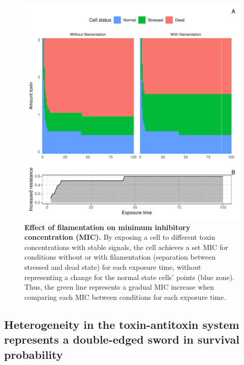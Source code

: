 \documentclass[a4paper, nobind]{templates/ociamthesis}
\begin{document}
\begin{figure}[H]
\includegraphics[width=1\linewidth]{downloadFigs4latex__main/increased-time-resistance} \caption[Effect of filamentation on minimum inhibitory concentration (MIC).]{\textbf{Effect of filamentation on minimum inhibitory concentration (MIC).} By exposing a cell to different toxin concentrations with stable signals, the cell achieves a set MIC for conditions without or with filamentation (separation between stressed and dead state) for each exposure time, without representing a change for the normal state cells' points (blue zone). Thus, the green line represents a gradual MIC increase when comparing each MIC between conditions for each exposure time.}\label{fig:increased-time-resistance}
\end{figure}

\hypertarget{heterogeneity-in-the-toxin-antitoxin-system-represents-a-double-edged-sword-in-survival-probability}{%
\subsection{Heterogeneity in the toxin-antitoxin system represents a double-edged sword in survival probability}\label{heterogeneity-in-the-toxin-antitoxin-system-represents-a-double-edged-sword-in-survival-probability}}
\end{document}
